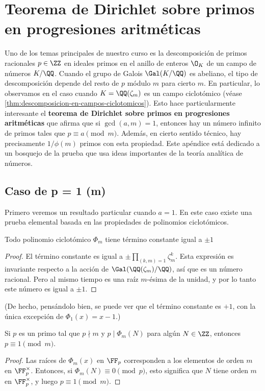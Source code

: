 \chapter{Teorema de Dirichlet sobre primos en progresiones aritméticas}

Uno de los temas principales de nuestro curso es la descomposición de primos
racionales $p \in \ZZ$ en ideales primos en el anillo de enteros $\O_K$ de un
campo de números $K/\QQ$. Cuando el grupo de Galois $\Gal (K/\QQ)$ es abeliano,
el tipo de descomposición depende del resto de $p$ módulo $m$ para cierto $m$.
En particular, lo observamos en el caso cuando $K = \QQ (\zeta_m)$ es un campo
ciclotómico (véase \ref{thm:descomposicion-en-campos-ciclotomicos}).
Esto hace particularmente interesante el
\textbf{teorema de Dirichlet sobre primos en progresiones aritméticas} que
afirma que si $\gcd (a,m) = 1$, entonces hay un número infinito de primos tales
que $p \equiv a \pmod{m}$. Además, en cierto sentido técnico, hay precisamente
$1/\phi(m)$ primos con esta propiedad. Este apéndice está dedicado a un bosquejo
de la prueba que usa ideas importantes de la teoría analítica de números.


\section{Caso de p = 1 (m)}

Primero veremos un resultado particular cuando $a = 1$. En este caso existe una
prueba elemental basada en las propiedades de polinomios ciclotómicos.

\begin{lema}
  Todo polinomio ciclotómico $\Phi_m$ tiene término constante igual a $\pm 1$

  \begin{proof}
    El término constante es igual a $\pm\prod_{(k,m) = 1} \zeta_m^k$. Esta
    expresión es invariante respecto a la acción de $\Gal (\QQ (\zeta_m)/\QQ)$,
    así que es un número racional. Pero al mismo tiempo es una raíz $m$-ésima
    de la unidad, y por lo tanto este número es igual a $\pm 1$.
  \end{proof}
\end{lema}

(De hecho, pensándolo bien, se puede ver que el término constante es $+1$, con
la única excepción de $\Phi_1 (x) = x - 1$.)

\begin{lema}
  Si $p$ es un primo tal que $p \nmid m$ y $p \mid \Phi_m (N)$ para algún
  $N \in \ZZ$, entonces $p \equiv 1 \pmod{m}$.

  \begin{proof}
    Las raíces de $\Phi_m (x)$ en $\FF_p$ corresponden a los elementos de orden
    $m$ en $\FF_p^\times$. Entonces, si $\Phi_m (N) \equiv 0 \pmod{p}$, esto
    significa que $N$ tiene orden $m$ en $\FF_p^\times$, y luego
    $p\equiv 1\pmod{m}$.
  \end{proof}
\end{lema}

